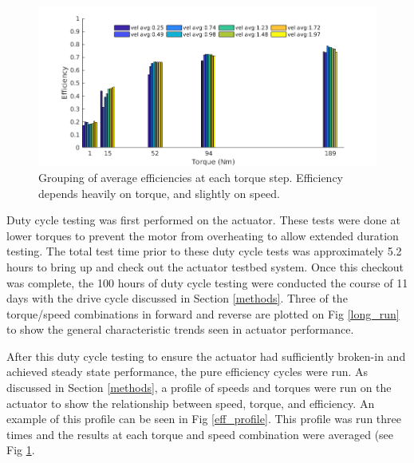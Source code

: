 
\begin{figure}[t]
   \centering
   \includegraphics[width=0.8\linewidth]{images/eff_test_bar_plot_v3}
   \caption{Grouping of average efficiencies at each torque step.
   Efficiency depends heavily on torque, and slightly on speed.}
   \label{eff_results}
\end{figure}

Duty cycle testing was first performed on the actuator.
These tests were done at lower torques to prevent the motor from overheating to allow extended duration testing.
The total test time prior to these duty cycle tests was approximately 5.2 hours to bring up and check out the actuator testbed system.
Once this checkout was complete, the 100 hours of duty cycle testing were conducted the course of 11 days with the drive cycle discussed in Section \ref{methods}.
Three of the torque/speed combinations in forward and reverse are plotted on Fig \ref{long_run} to show the general characteristic trends seen in actuator performance.

After this duty cycle testing to ensure the actuator had sufficiently broken-in and achieved steady state performance, the pure efficiency cycles were run.
As discussed in Section \ref{methods}, a profile of speeds and torques were run on the actuator to show the relationship between speed, torque, and efficiency.
An example of this profile can be seen in Fig \ref{eff_profile}.
This profile was run three times and the results at each torque and speed combination were averaged (see Fig \ref{eff_results}.
